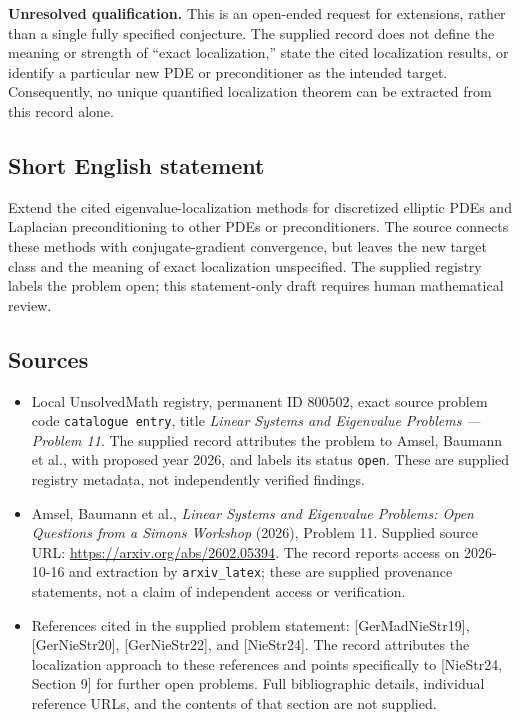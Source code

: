 \documentclass[11pt]{article}
\begin{document}
\textbf{Unresolved qualification.} This is an open-ended request for extensions, rather than a single fully specified conjecture. The supplied record does not define the meaning or strength of ``exact localization,'' state the cited localization results, or identify a particular new PDE or preconditioner as the intended target. Consequently, no unique quantified localization theorem can be extracted from this record alone.
\subsection{Short English statement}
Extend the cited eigenvalue-localization methods for discretized elliptic PDEs and Laplacian preconditioning to other PDEs or preconditioners. The source connects these methods with conjugate-gradient convergence, but leaves the new target class and the meaning of exact localization unspecified. The supplied registry labels the problem open; this statement-only draft requires human mathematical review.
\subsection{Sources}
\begin{itemize}
\item Local UnsolvedMath registry, permanent ID \(800502\), exact source problem code \texttt{catalogue entry}, title \emph{Linear Systems and Eigenvalue Problems --- Problem 11}. The supplied record attributes the problem to Amsel, Baumann et al., with proposed year 2026, and labels its status \texttt{open}. These are supplied registry metadata, not independently verified findings.
\item Amsel, Baumann et al., \emph{Linear Systems and Eigenvalue Problems: Open Questions from a Simons Workshop} (2026), Problem 11. Supplied source URL: \url{https://arxiv.org/abs/2602.05394}. The record reports access on 2026-10-16 and extraction by \texttt{arxiv\_latex}; these are supplied provenance statements, not a claim of independent access or verification.
\item References cited in the supplied problem statement: [GerMadNieStr19], [GerNieStr20], [GerNieStr22], and [NieStr24]. The record attributes the localization approach to these references and points specifically to [NieStr24, Section 9] for further open problems. Full bibliographic details, individual reference URLs, and the contents of that section are not supplied.
\end{itemize}
\end{document}
